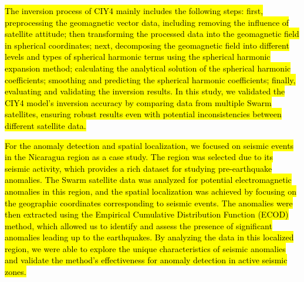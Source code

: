 \documentclass[3p,authoryear,preprint,12pt]{elsarticle}
\begin{document}
\hl{The inversion process of CIY4 mainly includes the following steps: first, preprocessing the geomagnetic vector data, including removing the influence of satellite attitude; then transforming the processed data into the geomagnetic field in spherical coordinates; next, decomposing the geomagnetic field into different levels and types of spherical harmonic terms using the spherical harmonic expansion method; calculating the analytical solution of the spherical harmonic coefficients; smoothing and predicting the spherical harmonic coefficients; finally, evaluating and validating the inversion results. In this study, we validated the CIY4 model's inversion accuracy by comparing data from multiple Swarm satellites, ensuring robust results even with potential inconsistencies between different satellite data.}

\hl{For the anomaly detection and spatial localization, we focused on seismic events in the Nicaragua region as a case study. The region was selected due to its seismic activity, which provides a rich dataset for studying pre-earthquake anomalies. The Swarm satellite data was analyzed for potential electromagnetic anomalies in this region, and the spatial localization was achieved by focusing on the geographic coordinates corresponding to seismic events. The anomalies were then extracted using the Empirical Cumulative Distribution Function (ECOD) method, which allowed us to identify and assess the presence of significant anomalies leading up to the earthquakes. By analyzing the data in this localized region, we were able to explore the unique characteristics of seismic anomalies and validate the method's effectiveness for anomaly detection in active seismic zones.}
\end{document}
